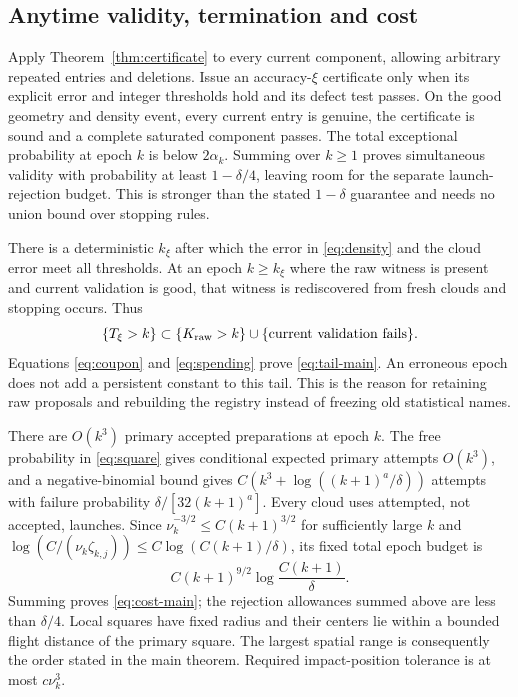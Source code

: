 \subsection{Anytime validity, termination and cost}
Apply Theorem~\ref{thm:certificate} to every current component, allowing
arbitrary repeated entries and deletions. Issue an accuracy-$\xi$
certificate only when its explicit error and integer thresholds hold
and its defect test passes. On the good geometry and density event,
every current entry is genuine, the certificate is sound and a complete
saturated component passes. The total exceptional probability at epoch
$k$ is below $2\alpha_k$. Summing over $k\ge1$ proves simultaneous
validity with probability at least $1-\delta/4$, leaving room for the
separate launch-rejection budget. This is stronger than the stated
$1-\delta$ guarantee and needs no union bound over stopping rules.

There is a deterministic $k_\xi$ after which the error in
\eqref{eq:density} and the cloud error meet all thresholds. At an epoch
$k\ge k_\xi$ where the raw witness is present and current validation is
good, that witness is rediscovered from fresh clouds and stopping occurs.
Thus
\[
 \{T_\xi>k\}\subset\{K_{\rm raw}>k\}\cup
                       \{\hbox{current validation fails}\}.
\]
Equations \eqref{eq:coupon} and \eqref{eq:spending} prove
\eqref{eq:tail-main}. An erroneous epoch does not add a persistent
constant to this tail. This is the reason for retaining raw proposals
and rebuilding the registry instead of freezing old statistical names.

There are $O(k^3)$ primary accepted preparations at epoch $k$. The free
probability in \eqref{eq:square} gives conditional expected primary
attempts $O(k^3)$, and a negative-binomial bound gives
$C(k^3+\log((k+1)^a/\delta))$ attempts with failure probability
$\delta/[32(k+1)^a]$. Every cloud uses attempted, not accepted, launches.
Since $\nu_k^{-3/2}\le C(k+1)^{3/2}$ for sufficiently large $k$ and
$\log(C/(\nu_k\zeta_{k,j}))\le C\log(C(k+1)/\delta)$, its fixed total
epoch budget is
\begin{equation}\label{eq:epoch-work}
 C(k+1)^{9/2}\log\frac{C(k+1)}{\delta}.
\end{equation}
Summing proves \eqref{eq:cost-main}; the rejection allowances summed
above are less than $\delta/4$. Local squares have fixed radius and their
centers lie within a bounded flight distance of the primary square.
The largest spatial range is consequently the order stated in the main
theorem. Required impact-position tolerance is at most $c\nu_k^3$.


